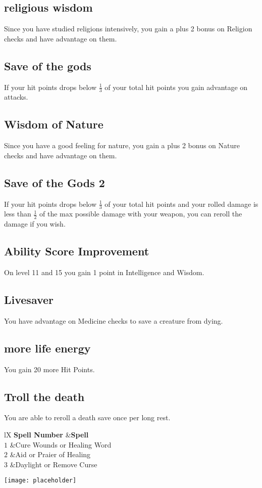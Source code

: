 \documentclass[a4paper,10pt,twoside,twocolumn]{dndbook} %
\begin{document}
	\subsection{religious wisdom}
	Since you have studied religions intensively, you gain a plus 2 bonus on Religion checks and have advantage on them.
	\subsection{Save of the gods}
	If your hit points drops below $\frac{1}{3}$ of your total hit points you gain advantage on attacks.
	\subsection{Wisdom of Nature}
	Since you have a good feeling for nature, you gain a plus 2 bonus on Nature checks and have advantage on them.
	\subsection{Save of the Gods 2}
	If your hit points drops below $\frac{1}{3}$ of your total hit points and your rolled damage is less than $\frac{1}{2}$ of the max possible damage with your weapon, you can reroll the damage if you wish.
	\subsection{Ability Score Improvement}
	On level 11 and 15 you gain 1 point in Intelligence and Wisdom.
	\subsection{Livesaver}
	You have advantage on Medicine checks to save a creature from dying.
	\subsection{more life energy}
	You gain 20 more Hit Points.
	\subsection{Troll the death}
	You are able to reroll a death save once per long rest.
	\begin{DndTable}[header=Spells]{lX}
		\textbf{Spell Number}	&\textbf{Spell}\\
		$1$						&Cure Wounds or Healing Word\\
		$2$						&Aid or Praier of Healing\\
		$3$						&Daylight or Remove Curse\\
	\end{DndTable}
	\hspace*{2cm}\texttt{[image: placeholder]}
\end{document}

